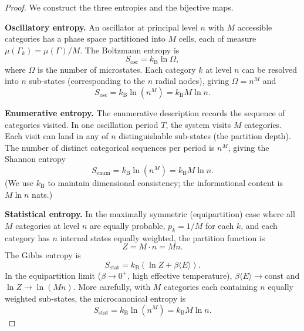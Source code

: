 \documentclass[11pt,twocolumn,a4paper]{article}
\newcommand{\kb}{k_{\mathrm{B}}}
\begin{document}
\begin{proof}
We construct the three entropies and the bijective maps.

\medskip
\noindent\textbf{Oscillatory entropy.}
An oscillator at principal level $n$ with $M$ accessible categories has a phase space partitioned into $M$ cells, each of measure $\mu(\Gamma_k) = \mu(\Gamma)/M$. The Boltzmann entropy is~\citep{boltzmann1877}
\begin{equation}
    S_{\text{osc}} = \kb \ln \Omega,
\end{equation}
where $\Omega$ is the number of microstates. Each category $k$ at level $n$ can be resolved into $n$ sub-states (corresponding to the $n$ radial nodes), giving $\Omega = n^M$ and
\begin{equation}
    S_{\text{osc}} = \kb \ln(n^M) = \kb M \ln n.
    \label{eq:S_osc}
\end{equation}

\medskip
\noindent\textbf{Enumerative entropy.}
The enumerative description records the sequence of categories visited. In one oscillation period $T$, the system visits $M$ categories. Each visit can land in any of $n$ distinguishable sub-states (the partition depth). The number of distinct categorical sequences per period is $n^M$, giving the Shannon entropy~\citep{shannon1948}
\begin{equation}
    S_{\text{enum}} = \kb \ln(n^M) = \kb M \ln n.
    \label{eq:S_enum}
\end{equation}
(We use $\kb$ to maintain dimensional consistency; the informational content is $M \ln n$ nats.)

\medskip
\noindent\textbf{Statistical entropy.}
In the maximally symmetric (equipartition) case where all $M$ categories at level $n$ are equally probable, $p_k = 1/M$ for each $k$, and each category has $n$ internal states equally weighted, the partition function is
\begin{equation}
    Z = M \cdot n = Mn.
\end{equation}
The Gibbs entropy is
\begin{equation}
    S_{\text{stat}} = \kb \left( \ln Z + \beta \langle E \rangle \right).
\end{equation}
In the equipartition limit ($\beta \to 0^+$, high effective temperature), $\beta \langle E \rangle \to \text{const}$ and $\ln Z \to \ln(Mn)$. More carefully, with $M$ categories each containing $n$ equally weighted sub-states, the microcanonical entropy is
\begin{equation}
    S_{\text{stat}} = \kb \ln(n^M) = \kb M \ln n.
    \label{eq:S_stat}
\end{equation}


\end{proof}
\end{document}
